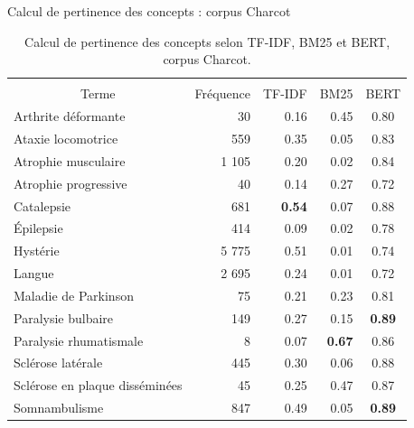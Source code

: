 \begin{frame}{Calcul de pertinence des concepts : corpus \og{}Charcot\fg{}}
\footnotesize
\begin{table}[]
\begin{tabular}{|l|cccc|}
\hline
\multicolumn{1}{|c|}{{ }} &
  \multicolumn{4}{c|}{\cellcolor[HTML]{FCFF2F}{ Corpus \og{}Charcot\fg{}}} \\ \cline{2-5} 
\multicolumn{1}{|c|}{\multirow{}{}{{Terme}}} &
  {Fréquence} &
  {TF-IDF} &
  {BM25} &
  {BERT} \\ \hline
{Arthrite déformante} &
  \multicolumn{1}{|r|}{{30}} &
  \multicolumn{1}{|r|}{{0.16}} &
  \multicolumn{1}{|r|}{{0.45}} &
  {0.80} \\ \hline
{Ataxie locomotrice} &
  \multicolumn{1}{|r|}{{559}} &
  \multicolumn{1}{|r|}{{0.35}} &
  \multicolumn{1}{|r|}{{0.05}} &
  {0.83} \\ \hline
{Atrophie musculaire} &
  \multicolumn{1}{|r|}{{1 105}} &
  \multicolumn{1}{|r|}{{0.20}} &
  \multicolumn{1}{|r|}{{0.02}} &
  {0.84} \\ \hline
{Atrophie progressive} &
  \multicolumn{1}{|r|}{{40}} &
  \multicolumn{1}{|r|}{{0.14}} &
  \multicolumn{1}{|r|}{{0.27}} &
  {0.72} \\ \hline
{Catalepsie} &
  \multicolumn{1}{|r|}{{681}} &
  \multicolumn{1}{|r|}{{\textbf{0.54}}} &
  \multicolumn{1}{|r|}{{0.07}} &
  {0.88} \\ \hline
{Épilepsie} &
  \multicolumn{1}{|r|}{{414}} &
  \multicolumn{1}{|r|}{{0.09}} &
  \multicolumn{1}{|r|}{{0.02}} &
  {0.78} \\ \hline
{Hystérie} &
  \multicolumn{1}{|r|}{{5 775}} &
  \multicolumn{1}{|r|}{{0.51}} &
  \multicolumn{1}{|r|}{{0.01}} &
  {0.74} \\ \hline
{Langue} &
  \multicolumn{1}{|r|}{{2 695}} &
  \multicolumn{1}{|r|}{{0.24}} &
  \multicolumn{1}{|r|}{{0.01}} &
  {0.72} \\ \hline
{Maladie de Parkinson} &
  \multicolumn{1}{|r|}{{75}} &
  \multicolumn{1}{|r|}{{0.21}} &
  \multicolumn{1}{|r|}{{0.23}} &
  {0.81} \\ \hline
{Paralysie bulbaire} &
  \multicolumn{1}{|r|}{{149}} &
  \multicolumn{1}{|r|}{{0.27}} &
  \multicolumn{1}{|r|}{{0.15}} &
  {\textbf{0.89}} \\ \hline
{Paralysie rhumatismale} &
  \multicolumn{1}{|r|}{{8}} &
  \multicolumn{1}{|r|}{{0.07}} &
  \multicolumn{1}{|r|}{{\textbf{0.67}}} &
  {0.86} \\ \hline
{Sclérose latérale} &
  \multicolumn{1}{|r|}{{445}} &
  \multicolumn{1}{|r|}{{0.30}} &
  \multicolumn{1}{|r|}{{0.06}} &
  {0.88} \\ \hline
{Sclérose en plaque disséminées} &
  \multicolumn{1}{|r|}{{45}} &
  \multicolumn{1}{|r|}{{0.25}} &
  \multicolumn{1}{|r|}{{0.47}} &
  {0.87} \\ \hline
{Somnambulisme} &
  \multicolumn{1}{|r|}{{847}} &
  \multicolumn{1}{|r|}{{0.49}} &
  \multicolumn{1}{|r|}{{0.05}} &
  {\textbf{0.89}} \\ \hline
\end{tabular}
\caption{Calcul de pertinence des concepts selon TF-IDF, BM25 et BERT, corpus \og{}Charcot\fg{}.}
\end{table}
\end{frame}


